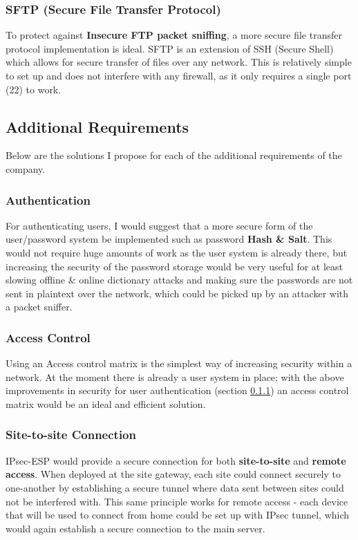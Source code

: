 \documentclass[11pt]{article}
\begin{document}
        \subsubsection{SFTP (Secure File Transfer Protocol)}
          To protect against \textbf{Insecure FTP packet sniffing}, a more secure file transfer protocol implementation is ideal. SFTP is an extension of SSH (Secure Shell) which allows for secure transfer of files over any network. This is relatively simple to set up and does not interfere with any firewall, as it only requires a single port (22) to work.

      \subsection{Additional Requirements}
        Below are the solutions I propose for each of the additional requirements of the company.

        \subsubsection{Authentication} \label{auth}
          For authenticating users, I would suggest that a more secure form of the user/password system be implemented such as password \textbf{Hash \& Salt}. This would not require huge amounts of work as the user system is already there, but increasing the security of the password storage would be very useful for at least slowing offline \& online dictionary attacks and making sure the passwords are not sent in plaintext over the network, which could be picked up by an attacker with a packet sniffer.

        \subsubsection{Access Control}
          Using an Access control matrix is the simplest way of increasing security within a network. At the moment there is already a user system in place; with the above improvements in security for user authentication (section \ref{auth}) an access control matrix would be an ideal and efficient solution.

        \subsubsection{Site-to-site Connection} \label{ipsec2}
          IPsec-ESP would provide a secure connection for both \textbf{site-to-site} and \textbf{remote access}. When deployed at the site gateway, each site could connect securely to one-another by establishing a secure tunnel where data sent between sites could not be interfered with. This same principle works for remote access - each device that will be used to connect from home could be set up with IPsec tunnel, which would again establish a secure connection to the main server.
\end{document}
